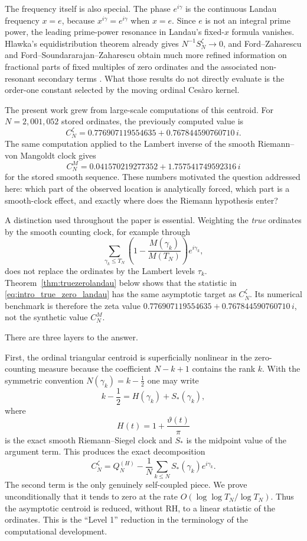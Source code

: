 \documentclass[11pt]{amsart}
\numberwithin{equation}{section}
\theoremstyle{definition}
\theoremstyle{remark}
\begin{document}
The frequency itself is also special.  The phase $e^{i\gamma}$ is the continuous Landau frequency $x=e$, because $x^{i\gamma}=e^{i\gamma}$ when $x=e$.  Since $e$ is not an integral prime power, the leading prime-power resonance in Landau's fixed-$x$ formula vanishes.  Hlawka's equidistribution theorem already gives $N^{-1}S_N^{\zeta}\to0$, and Ford--Zaharescu and Ford--Soundararajan--Zaharescu obtain much more refined information on fractional parts of fixed multiples of zero ordinates and the associated non-resonant secondary terms \cite{Hlawka,FordZaharescu2005,FordSoundZaha2009}.  What those results do not directly evaluate is the order-one constant selected by the moving ordinal Cesàro kernel.

The present work grew from large-scale computations of this centroid.  For $N=2{,}001{,}052$ stored ordinates, the previously computed value is
\[
C_N^{\zeta}
=0.776907119554635+0.767844590760710\,i.
\]
The same computation applied to the Lambert inverse of the smooth Riemann--von Mangoldt clock gives
\[
C_N^{M}
=0.041570219277352+1.757541749592316\,i
\]
for the stored smooth sequence.  These numbers motivated the question addressed here: which part of the observed location is analytically forced, which part is a smooth-clock effect, and exactly where does the Riemann hypothesis enter?

A distinction used throughout the paper is essential.  Weighting the \emph{true} ordinates by the smooth counting clock, for example through
\begin{equation}\label{eq:intro_true_zero_landau}
\sum_{\gamma_k\leq T_N}\left(1-\frac{M(\gamma_k)}{M(T_N)}\right)e^{i\gamma_k},
\end{equation}
does not replace the ordinates by the Lambert levels $\tau_k$.  Theorem~\ref{thm:truezerolandau} below shows that the statistic in \eqref{eq:intro_true_zero_landau} has the same asymptotic target as $C_N^{\zeta}$.  Its numerical benchmark is therefore the zeta value $0.776907119554635+0.767844590760710\,i$, not the synthetic value $C_N^M$.

There are three layers to the answer.

First, the ordinal triangular centroid is superficially nonlinear in the zero-counting measure because the coefficient $N-k+1$ contains the rank $k$.  With the symmetric convention $N(\gamma_k)=k-\tfrac12$ one may write
\[
k-\frac12=H(\gamma_k)+S_*(\gamma_k),
\]
where
\[
H(t)=1+\frac{\vartheta(t)}{\pi}
\]
is the exact smooth Riemann--Siegel clock and $S_*$ is the midpoint value of the argument term.  This produces the exact decomposition
\[
C_N^{\zeta}
=Q_N^{(H)}-\frac1N\sum_{k\leq N}S_*(\gamma_k)e^{i\gamma_k}.
\]
The second term is the only genuinely self-coupled piece.  We prove unconditionally that it tends to zero at the rate $O(\log\log T_N/\log T_N)$.  Thus the asymptotic centroid is reduced, without RH, to a linear statistic of the ordinates.  This is the ``Level 1'' reduction in the terminology of the computational development.
\end{document}
